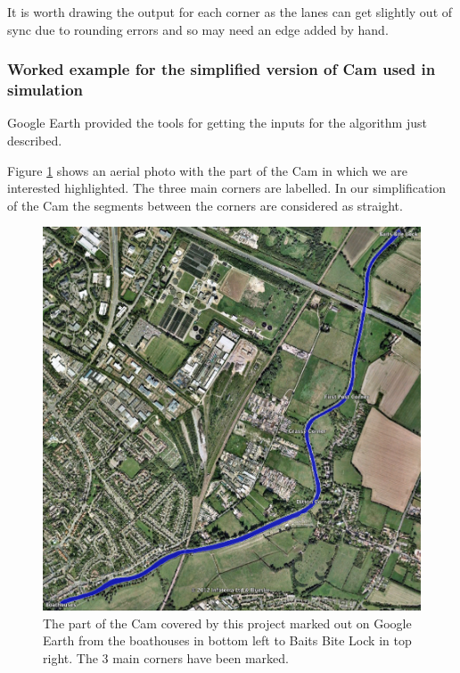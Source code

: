        It is worth drawing the output for each corner as the lanes can get slightly out of sync due to rounding errors and so may need an edge added by hand.
      
      \subsubsection{Worked example for the simplified version of Cam used in simulation}
      Google Earth provided the tools for getting the inputs for the algorithm just described.
      
      Figure \ref{techissues:fig:actualcam} shows an aerial photo with the part of the Cam in which we are interested highlighted. The three main corners are labelled. In our simplification of the Cam the segments between the corners are considered as straight.
      
      \begin{figure}
      \begin{center}
        \includegraphics[scale=0.45]{images/GoogleEarthCam.png}
        \caption{The part of the Cam covered by this project marked out on Google Earth from the boathouses in bottom left to Baits Bite Lock in top right. The 3 main corners have been marked.}
        \label{techissues:fig:actualcam}
      \end{center}
      \end{figure}
      
